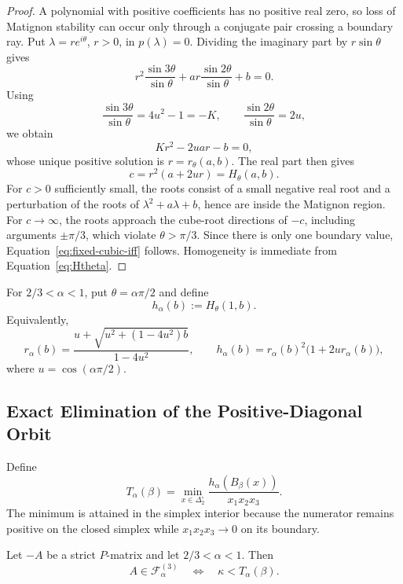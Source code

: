 \begin{proof}
A polynomial with positive coefficients has no positive real zero, so loss of Matignon stability can occur only through a conjugate pair crossing a boundary ray. Put \(\lambda=re^{i\theta}\), \(r>0\), in \(p(\lambda)=0\). Dividing the imaginary part by \(r\sin\theta\) gives
\[
r^2\frac{\sin3\theta}{\sin\theta}
+
ar\frac{\sin2\theta}{\sin\theta}
+b=0.
\]
Using
\[
\frac{\sin3\theta}{\sin\theta}=4u^2-1=-K,
\qquad
\frac{\sin2\theta}{\sin\theta}=2u,
\]
we obtain
\[
Kr^2-2uar-b=0,
\]
whose unique positive solution is \(r=r_\theta(a,b)\). The real part then gives
\[
c=r^2(a+2ur)=H_\theta(a,b).
\]
For \(c>0\) sufficiently small, the roots consist of a small negative real root and a perturbation of the roots of \(\lambda^2+a\lambda+b\), hence are inside the Matignon region. For \(c\to\infty\), the roots approach the cube-root directions of \(-c\), including arguments \(\pm\pi/3\), which violate \(\theta>\pi/3\). Since there is only one boundary value, Equation~\eqref{eq:fixed-cubic-iff} follows. Homogeneity is immediate from Equation~\eqref{eq:Htheta}.
\end{proof}

For \(2/3<\alpha<1\), put \(\theta=\alpha\pi/2\) and define
\begin{equation}
h_\alpha(b):=H_\theta(1,b).
\end{equation}
Equivalently,
\begin{equation}
r_\alpha(b)
=
\frac{u+\sqrt{u^2+(1-4u^2)b}}{1-4u^2},
\qquad
h_\alpha(b)
=
r_\alpha(b)^2\bigl(1+2ur_\alpha(b)\bigr),
\label{eq:halpha}
\end{equation}
where \(u=\cos(\alpha\pi/2)\).

\subsection{Exact Elimination of the Positive-Diagonal Orbit}

Define
\begin{equation}
T_\alpha(\beta)
=
\min_{x\in\Delta_2^\circ}
\frac{h_\alpha(B_\beta(x))}{x_1x_2x_3}.
\label{eq:Talpha}
\end{equation}
The minimum is attained in the simplex interior because the numerator remains positive on the closed simplex while \(x_1x_2x_3\to0\) on its boundary.

\begin{Theorem}\label{thm:c10}
Let \(-A\) be a strict \(P\)-matrix and let \(2/3<\alpha<1\). Then
\begin{equation}
\boxed{
A\in\mathcal F_\alpha^{(3)}
\quad\Longleftrightarrow\quad
\kappa<T_\alpha(\beta).
}
\label{eq:c10-iff}
\end{equation}
\end{Theorem}

